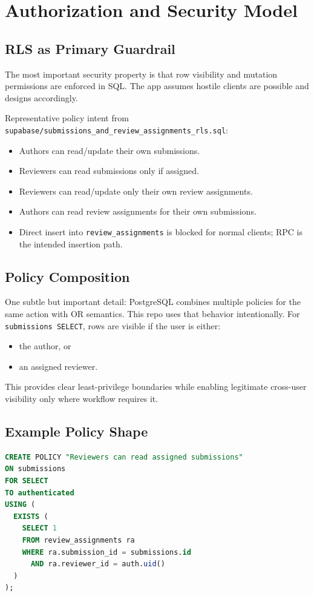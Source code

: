 \documentclass[11pt]{article}
\begin{document}
\section{Authorization and Security Model}
\subsection{RLS as Primary Guardrail}
The most important security property is that row visibility and mutation permissions are enforced in SQL. The app assumes hostile clients are possible and designs accordingly.

Representative policy intent from \texttt{supabase/submissions\_and\_review\_assignments\_rls.sql}:
\begin{itemize}[leftmargin=*]
  \item Authors can read/update their own submissions.
  \item Reviewers can read submissions only if assigned.
  \item Reviewers can read/update only their own review assignments.
  \item Authors can read review assignments for their own submissions.
  \item Direct insert into \texttt{review\_assignments} is blocked for normal clients; RPC is the intended insertion path.
\end{itemize}

\subsection{Policy Composition}
One subtle but important detail: PostgreSQL combines multiple policies for the same action with OR semantics. This repo uses that behavior intentionally. For \texttt{submissions SELECT}, rows are visible if the user is either:
\begin{itemize}[leftmargin=*]
  \item the author, or
  \item an assigned reviewer.
\end{itemize}

This provides clear least-privilege boundaries while enabling legitimate cross-user visibility only where workflow requires it.

\subsection{Example Policy Shape}
\begin{lstlisting}[style=repo,language=SQL,caption={Representative RLS pattern}]
CREATE POLICY "Reviewers can read assigned submissions"
ON submissions
FOR SELECT
TO authenticated
USING (
  EXISTS (
    SELECT 1
    FROM review_assignments ra
    WHERE ra.submission_id = submissions.id
      AND ra.reviewer_id = auth.uid()
  )
);
\end{lstlisting}
\end{document}
